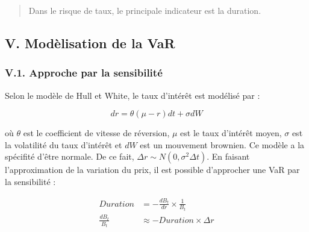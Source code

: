 \documentclass[
  letterpaper,
  DIV=11,
  numbers=noendperiod]{scrartcl}
\begin{document}
\begin{quote}
Dans le risque de taux, le principale indicateur est la duration.
\end{quote}

\subsection{V. Modèlisation de la
VaR}\label{v.-moduxe8lisation-de-la-var}

\subsubsection{V.1. Approche par la
sensibilité}\label{v.1.-approche-par-la-sensibilituxe9}

Selon le modèle de Hull et White, le taux d'intérêt est modélisé par :

\[
dr = \theta ( \mu - r) dt + \sigma dW
\]

où \(\theta\) est le coefficient de vitesse de réversion, \(\mu\) est le
taux d'intérêt moyen, \(\sigma\) est la volatilité du taux d'intérêt et
\(dW\) est un mouvement brownien. Ce modèle a la spécifité d'être
normale. De ce fait, \(\Delta r \sim N(0, \sigma^2 \Delta t)\). En
faisant l'approximation de la variation du prix, il est possible
d'approcher une VaR par la sensibilité :

\[
\begin{aligned}
Duration &= - \frac{d B_t}{d r} \times \frac{1}{B_t} \\
\frac{d B_t}{B_t} &\approx - Duration \times  \Delta r \\
\end{aligned}
\]
\end{document}
